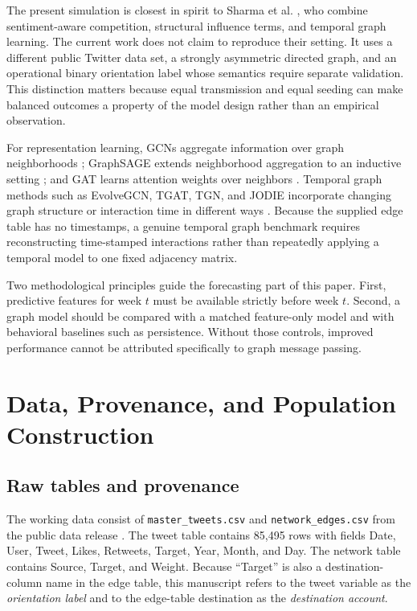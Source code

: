 \documentclass[11pt,a4paper]{article}
\begin{document}
The present simulation is closest in spirit to Sharma et al. \citep{sharma2026}, who combine sentiment-aware competition, structural influence terms, and temporal graph learning. The current work does not claim to reproduce their setting. It uses a different public Twitter data set, a strongly asymmetric directed graph, and an operational binary orientation label whose semantics require separate validation. This distinction matters because equal transmission and equal seeding can make balanced outcomes a property of the model design rather than an empirical observation.

For representation learning, GCNs aggregate information over graph neighborhoods \citep{kipf2017}; GraphSAGE extends neighborhood aggregation to an inductive setting \citep{hamilton2017}; and GAT learns attention weights over neighbors \citep{velickovic2018}. Temporal graph methods such as EvolveGCN, TGAT, TGN, and JODIE incorporate changing graph structure or interaction time in different ways \citep{pareja2020,xu2020,rossi2020,kumar2019}. Because the supplied edge table has no timestamps, a genuine temporal graph benchmark requires reconstructing time-stamped interactions rather than repeatedly applying a temporal model to one fixed adjacency matrix.

Two methodological principles guide the forecasting part of this paper. First, predictive features for week $t$ must be available strictly before week $t$. Second, a graph model should be compared with a matched feature-only model and with behavioral baselines such as persistence. Without those controls, improved performance cannot be attributed specifically to graph message passing.

\section{Data, Provenance, and Population Construction}
\subsection{Raw tables and provenance}
The working data consist of \texttt{master\_tweets.csv} and \texttt{network\_edges.csv} from the public data release \citep{kaggleipte}. The tweet table contains 85,495 rows with fields Date, User, Tweet, Likes, Retweets, Target, Year, Month, and Day. The network table contains Source, Target, and Weight. Because ``Target'' is also a destination-column name in the edge table, this manuscript refers to the tweet variable as the \emph{orientation label} and to the edge-table destination as the \emph{destination account}.
\end{document}
